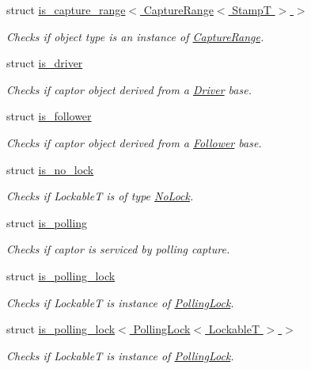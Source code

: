 \begin{DoxyCompactItemize}
struct \hyperlink{structflow_1_1is__capture__range_3_01_capture_range_3_01_stamp_t_01_4_01_4}{is\+\_\+capture\+\_\+range$<$ Capture\+Range$<$ Stamp\+T $>$ $>$}
\begin{DoxyCompactList}\small\item\em Checks if object type is an instance of \hyperlink{structflow_1_1_capture_range}{Capture\+Range}. \end{DoxyCompactList}\item 
struct \hyperlink{structflow_1_1is__driver}{is\+\_\+driver}
\begin{DoxyCompactList}\small\item\em Checks if captor object derived from a \hyperlink{classflow_1_1_driver}{Driver} base. \end{DoxyCompactList}\item 
struct \hyperlink{structflow_1_1is__follower}{is\+\_\+follower}
\begin{DoxyCompactList}\small\item\em Checks if captor object derived from a \hyperlink{classflow_1_1_follower}{Follower} base. \end{DoxyCompactList}\item 
struct \hyperlink{structflow_1_1is__no__lock}{is\+\_\+no\+\_\+lock}
\begin{DoxyCompactList}\small\item\em Checks if {\ttfamily LockableT} is of type \hyperlink{structflow_1_1_no_lock}{No\+Lock}. \end{DoxyCompactList}\item 
struct \hyperlink{structflow_1_1is__polling}{is\+\_\+polling}
\begin{DoxyCompactList}\small\item\em Checks if captor is serviced by polling capture. \end{DoxyCompactList}\item 
struct \hyperlink{structflow_1_1is__polling__lock}{is\+\_\+polling\+\_\+lock}
\begin{DoxyCompactList}\small\item\em Checks if {\ttfamily LockableT} is instance of \hyperlink{structflow_1_1_polling_lock}{Polling\+Lock}. \end{DoxyCompactList}\item 
struct \hyperlink{structflow_1_1is__polling__lock_3_01_polling_lock_3_01_lockable_t_01_4_01_4}{is\+\_\+polling\+\_\+lock$<$ Polling\+Lock$<$ Lockable\+T $>$ $>$}
\begin{DoxyCompactList}\small\item\em Checks if {\ttfamily LockableT} is instance of \hyperlink{structflow_1_1_polling_lock}{Polling\+Lock}. \end{DoxyCompactList}\item 

\end{DoxyCompactItemize}
